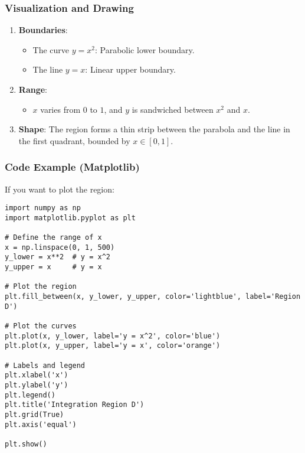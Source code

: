 \documentclass[a4paper,12pt]{book}
\begin{document}
\subsubsection{Visualization and Drawing}
\begin{enumerate}
\item 
\textbf{Boundaries}:
\begin{itemize}
\item 
The curve \(y = x^2\): Parabolic lower boundary.

\item 
The line \(y = x\): Linear upper boundary.

\end{itemize}

\item 
\textbf{Range}:
\begin{itemize}
\item 
\(x\) varies from \(0\) to \(1\), and \(y\) is sandwiched between \(x^2\) and \(x\).

\end{itemize}

\item 
\textbf{Shape}:
The region forms a thin strip between the parabola and the line in the first quadrant, bounded by \(x \in [0, 1]\).

\end{enumerate}

\subsubsection{Code Example (Matplotlib)}

If you want to plot the region:

\begin{verbatim}
import numpy as np
import matplotlib.pyplot as plt

# Define the range of x
x = np.linspace(0, 1, 500)
y_lower = x**2  # y = x^2
y_upper = x     # y = x

# Plot the region
plt.fill_between(x, y_lower, y_upper, color='lightblue', label='Region D')

# Plot the curves
plt.plot(x, y_lower, label='y = x^2', color='blue')
plt.plot(x, y_upper, label='y = x', color='orange')

# Labels and legend
plt.xlabel('x')
plt.ylabel('y')
plt.legend()
plt.title('Integration Region D')
plt.grid(True)
plt.axis('equal')

plt.show()
\end{verbatim}
\end{document}
